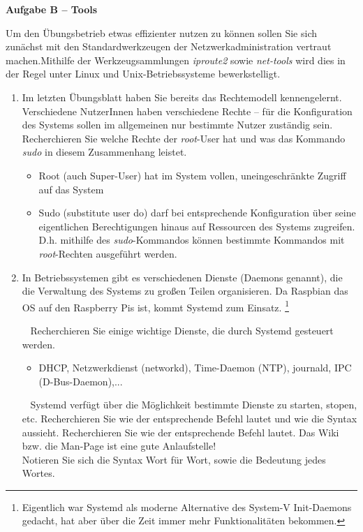 \documentclass[paper=a4,fontsize=11pt]{scrartcl}%
\numberwithin{equation}{section}
\begin{document}
\begin{center}\Large{\textbf{Aufgabe B -- Tools}}\end{center}\vskip0.25in
Um den Übungsbetrieb etwas effizienter nutzen zu können sollen Sie sich zunächst mit den Standardwerkzeugen der Netzwerkadministration vertraut machen.Mithilfe der Werkzeugsammlungen \emph{iproute2} sowie \emph{net-tools} wird dies in der Regel unter Linux und Unix-Betriebssysteme bewerkstelligt.  
\begin{enumerate}
	\item Im letzten Übungsblatt haben Sie bereits das Rechtemodell kennengelernt. Verschiedene NutzerInnen haben verschiedene Rechte -- für die Konfiguration des Systems sollen im allgemeinen nur bestimmte Nutzer zuständig sein. Recherchieren Sie welche Rechte der \emph{root}-User hat und was das Kommando \emph{sudo} in diesem Zusammenhang leistet.
	\begin{itemize}
		\item Root (auch Super-User) hat im System vollen, uneingeschränkte Zugriff auf das System
		\item Sudo (substitute user do) darf bei entsprechende Konfiguration über seine eigentlichen Berechtigungen hinaus auf Ressourcen des Systems zugreifen. D.h. mithilfe des \emph{sudo}-Kommandos können bestimmte Kommandos mit \emph{root}-Rechten ausgeführt werden. 
	\end{itemize}
	\item In Betriebssystemen gibt es verschiedenen Dienste (Daemons genannt), die die Verwaltung des Systems zu großen Teilen organisieren. Da Raspbian das OS auf den Raspberry Pis ist, kommt Systemd zum Einsatz. \footnote{Eigentlich war Systemd als moderne Alternative des System-V Init-Daemons gedacht, hat aber über die Zeit immer mehr Funktionalitäten bekommen.}
	\begin{tasks}
		\task~ Recherchieren Sie einige wichtige Dienste, die durch Systemd gesteuert werden.
		\begin{itemize}
			\item DHCP, Netzwerkdienst (networkd), Time-Daemon (NTP), journald, IPC (D-Bus-Daemon),...  
		\end{itemize}
		\task~ Systemd verfügt über die Möglichkeit bestimmte Dienste zu starten, stopen, etc. Recherchieren Sie wie der entsprechende Befehl lautet und wie die Syntax aussieht. Recherchieren Sie wie der entsprechende Befehl lautet. Das Wiki
bzw. die Man-Page ist eine gute Anlaufstelle!\\
		Notieren Sie sich die Syntax Wort für Wort, sowie die Bedeutung jedes Wortes.

\end{tasks}
\end{enumerate}
\end{document}
